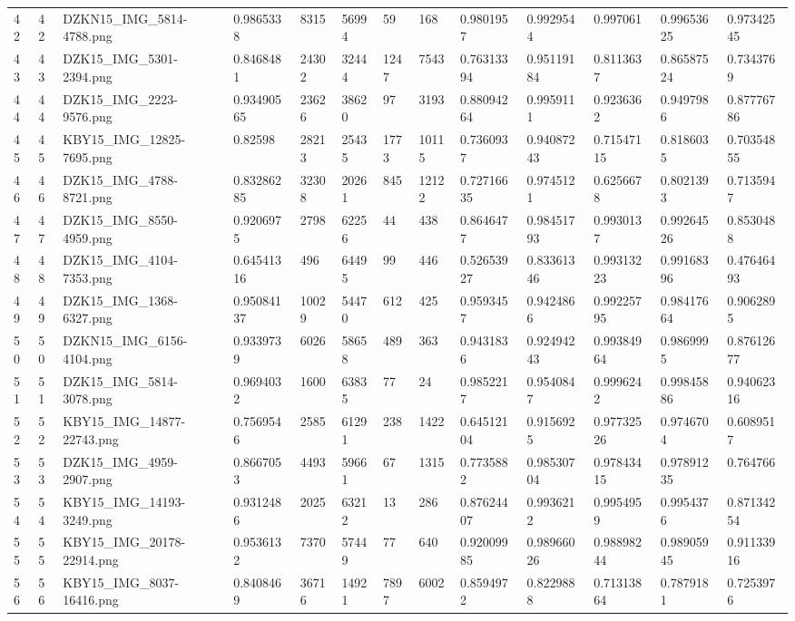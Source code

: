 \documentclass[11pt, a4paper, twoside]{report}
\begin{document}
\begin{longtable}[c]{@{}lllllllllllll@{}}
42 & 42 & DZKN15\_IMG\_5814-4788.png & 0.9865338 & 8315 & 56994 & 59 & 168 & 0.9801957 & 0.9929544 & 0.997061 & 0.99653625 & 0.97342545 \\
43 & 43 & DZK15\_IMG\_5301-2394.png & 0.8468481 & 24302 & 32444 & 1247 & 7543 & 0.76313394 & 0.95119184 & 0.8113637 & 0.86587524 & 0.7343769 \\
44 & 44 & DZK15\_IMG\_2223-9576.png & 0.93490565 & 23626 & 38620 & 97 & 3193 & 0.88094264 & 0.9959111 & 0.9236362 & 0.9497986 & 0.87776786 \\
45 & 45 & KBY15\_IMG\_12825-7695.png & 0.82598 & 28213 & 25435 & 1773 & 10115 & 0.7360937 & 0.94087243 & 0.71547115 & 0.8186035 & 0.70354855 \\
46 & 46 & DZK15\_IMG\_4788-8721.png & 0.83286285 & 32308 & 20261 & 845 & 12122 & 0.72716635 & 0.9745121 & 0.6256678 & 0.8021393 & 0.7135947 \\
47 & 47 & DZK15\_IMG\_8550-4959.png & 0.9206975 & 2798 & 62256 & 44 & 438 & 0.8646477 & 0.98451793 & 0.9930137 & 0.99264526 & 0.8530488 \\
48 & 48 & DZK15\_IMG\_4104-7353.png & 0.64541316 & 496 & 64495 & 99 & 446 & 0.52653927 & 0.83361346 & 0.99313223 & 0.99168396 & 0.47646493 \\
49 & 49 & DZK15\_IMG\_1368-6327.png & 0.95084137 & 10029 & 54470 & 612 & 425 & 0.9593457 & 0.9424866 & 0.99225795 & 0.98417664 & 0.9062895 \\
50 & 50 & DZKN15\_IMG\_6156-4104.png & 0.9339739 & 6026 & 58658 & 489 & 363 & 0.9431836 & 0.92494243 & 0.99384964 & 0.9869995 & 0.87612677 \\
51 & 51 & DZK15\_IMG\_5814-3078.png & 0.9694032 & 1600 & 63835 & 77 & 24 & 0.9852217 & 0.9540847 & 0.9996242 & 0.99845886 & 0.94062316 \\
52 & 52 & KBY15\_IMG\_14877-22743.png & 0.7569546 & 2585 & 61291 & 238 & 1422 & 0.64512104 & 0.9156925 & 0.97732526 & 0.9746704 & 0.6089517 \\
53 & 53 & DZK15\_IMG\_4959-2907.png & 0.8667053 & 4493 & 59661 & 67 & 1315 & 0.7735882 & 0.98530704 & 0.97843415 & 0.97891235 & 0.764766 \\
54 & 54 & KBY15\_IMG\_14193-3249.png & 0.9312486 & 2025 & 63212 & 13 & 286 & 0.87624407 & 0.9936212 & 0.9954959 & 0.9954376 & 0.87134254 \\
55 & 55 & KBY15\_IMG\_20178-22914.png & 0.9536132 & 7370 & 57449 & 77 & 640 & 0.92009985 & 0.98966026 & 0.98898244 & 0.98905945 & 0.91133916 \\
56 & 56 & KBY15\_IMG\_8037-16416.png & 0.8408469 & 36716 & 14921 & 7897 & 6002 & 0.8594972 & 0.8229888 & 0.71313864 & 0.7879181 & 0.7253976 \\

\end{longtable}
\end{document}
